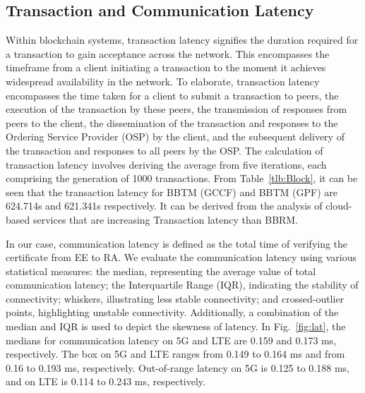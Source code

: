\subsection{Transaction and Communication Latency}
Within blockchain systems, transaction latency signifies the duration required for a transaction to gain acceptance across the network. This encompasses the timeframe from a client initiating a transaction to the moment it achieves widespread availability in the network. To elaborate, transaction latency encompasses the time taken for a client to submit a transaction to peers, the execution of the transaction by these peers, the transmission of responses from peers to the client, the dissemination of the transaction and responses to the Ordering Service Provider (OSP) by the client, and the subsequent delivery of the transaction and responses to all peers by the OSP. The calculation of transaction latency involves deriving the average from five iterations, each comprising the generation of 1000 transactions. From Table~\ref{tlb:Block}, it can be seen that the transaction latency for BBTM (GCCF) and BBTM (GPF) are 624.714s and 621.341s respectively. It can be derived from the analysis of cloud-based services that are increasing Transaction latency than BBRM.  

In our case, communication latency is defined as the total time of verifying the certificate from EE to RA. We evaluate the communication latency using various statistical measures: the median, representing the average value of total communication latency; the Interquartile Range (IQR), indicating the stability of connectivity; whiskers, illustrating less stable connectivity; and crossed-outlier points, highlighting unstable connectivity. Additionally, a combination of the median and IQR is used to depict the skewness of latency. In Fig.~\ref{fig:lat}, the medians for communication latency on 5G and LTE are 0.159 and 0.173 ms, respectively. The box on 5G and LTE ranges from 0.149 to 0.164 ms and from 0.16 to 0.193 ms, respectively. Out-of-range latency on 5G is 0.125 to 0.188 ms, and on LTE is 0.114 to 0.243 ms, respectively.



